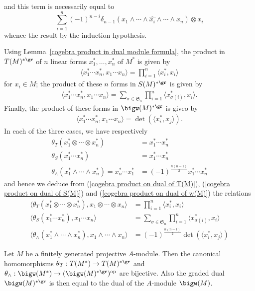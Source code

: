 and this term is necessarily equal to
\[\sum_{i=1}^{n}(-1)^{n-i}\delta_{n-1}(x_1\wedge\cdots\wedge\widehat{x_i}\wedge\cdots\wedge x_n)\otimes x_i\]
whence the result by the induction hypothesis.\par
Using Lemma~\ref{cogebra product in dual module formula}, the product in $T(M)^{*\gr}$ of $n$ linear forms $x_1^*,\dots,x_n^*$ of $M^*$ is given by
\begin{align}\label{cogebra product on dual of T(M)}
\langle x_1^*\cdots x_n^*,x_1\cdots x_n\rangle=\prod_{i=1}^{n}\langle x_i^*,x_i\rangle
\end{align}
for $x_i\in M$; the product of these $n$ forms in $S(M)^{*\gr}$ is given by
\begin{align}\label{cogebra product on dual of S(M)}
\langle x_1^*\cdots x_n^*,x_1\cdots x_n\rangle=\sum_{\sigma\in\mathfrak{S}_n}\prod_{i=1}^{n}\langle x_{\sigma(i)}^*,x_i\rangle.
\end{align}
Finally, the product of these forms in $\bigw(M)^{*\gr}$ is giveo by
\begin{align}\label{cogebra product on dual of w(M)}
\langle x_1^*\cdots x_n^*,x_1\cdots x_n\rangle=\det(\langle x_i^*,x_j\rangle).
\end{align}
In each of the three cases, we have respectively
\begin{align*}
\theta_T(x_1^*\otimes\cdots\otimes x_n^*)&=x_1^*\cdots x_n^*\\
\theta_S(x_1^*\cdots x_n^*)&=x_1^*\cdots x_n^*\\
\theta_{\wedge}(x_1^*\wedge\cdots\wedge x_n^*)=x_n^*\cdots x_1^*&=(-1)^{\frac{n(n-1)}{2}}x_1^*\cdots x_n^*
\end{align*}
and hence we deduce from (\ref{cogebra product on dual of T(M)}), (\ref{cogebra product on dual of S(M)}) and (\ref{cogebra product on dual of w(M)}) the relations
\begin{align}
\langle\theta_T(x_1^*\otimes\cdots\otimes x_n^*),x_1\otimes\cdots\otimes x_n\rangle&=\prod_{i=1}^{n}\langle x_i^*,x_i\rangle\label{cogebra theta map on T(M) formula}\\
\langle\theta_S(x_1^*\cdots x_n^*),x_1\cdots x_n\rangle&=\sum_{\sigma\in\mathfrak{S}_n}\prod_{i=1}^{n}\langle x_{\sigma(i)}^*,x_i\rangle\label{cogebra theta map on S(M) formula}\\
\langle\theta_{\wedge}(x_1^*\wedge\cdots\wedge x_n^*),x_1\wedge\cdots\wedge x_n\rangle&=(-1)^{\frac{n(n-1)}{2}}\det(\langle x_i^*,x_j\rangle)\label{cogebra theta map on w(M) formula}
\end{align}
\begin{proposition}\label{cogebra dual of T and w finite projective module}
Let $M$ be a finitely generated projective $A$-module. Then the canonical homomorphisms $\theta_T:T(M^*)\to T(M)^{*\gr}$ and $\theta_{\wedge}:\bigw(M^*)\to(\bigw(M)^{*\gr})^{\text{op}}$ are bijective. Also the graded dual $\bigw(M)^{*\gr}$ is then equal to the dual of the $A$-module $\bigw(M)$.
\end{proposition}
